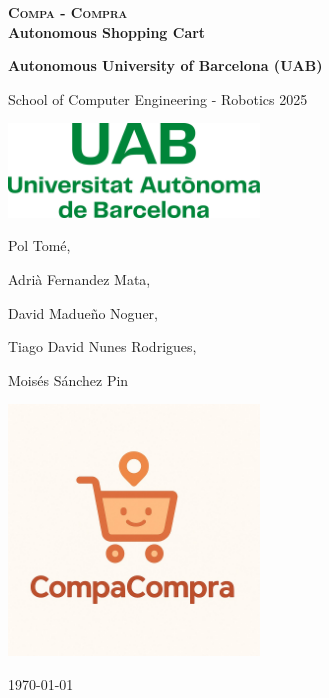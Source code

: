 \documentclass[a4paper,11pt]{article}
\begin{document}
\begin{titlepage}
    \centering
    \vspace*{2cm}

    {\Huge\bfseries \textsc{Compa - Compra}  \\ \Large{Autonomous Shopping Cart} \par}

    \vspace{0.5cm}
    {\Large\bfseries Autonomous University of Barcelona (UAB)

    School of Computer Engineering - Robotics 2025 \par}

    \vspace{0.5cm}

    \includegraphics[width=0.5\textwidth]{Logo_uab.png} %

    \vspace{0.5cm}
    {\large Pol Tomé,

    Adrià Fernandez Mata,

    David Madueño Noguer,

    Tiago David Nunes Rodrigues,

    Moisés Sánchez Pin
     \par}

    \vspace{1cm}
    \includegraphics[width=0.5\textwidth]{compacompra_logo.jpg} %

    \vfill
    {\Large \today} %

\end{titlepage}
\end{document}

